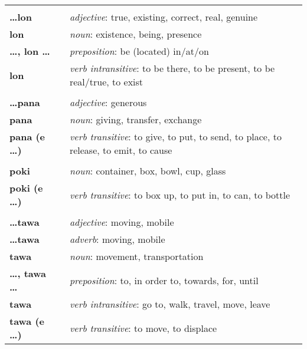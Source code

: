 \begin{supertabular}{p{2,5cm}|ll}
 && \\ %
%
\textbf{\dots lon} && \textit{adjective}: true, existing, correct, real, genuine \\ %
\textbf{lon} && \textit{noun}: existence, being, presence \\ %
\textbf{\dots , lon \dots} && \textit{preposition}: be (located) in/at/on \\ %
\textbf{lon} && \textit{verb intransitive}: to be there, to be present, to be real/true, to exist \\ %
 && \\ %
%
\textbf{\dots pana} && \textit{adjective}: generous \\ %
\textbf{pana} && \textit{noun}: giving, transfer, exchange \\ %
\textbf{pana (e \dots)} && \textit{verb transitive}: to give, to put, to send, to place, to release, to emit, to cause \\ %
 && \\ %
%
\textbf{poki} && \textit{noun}: container, box, bowl, cup, glass \\ %
\textbf{poki (e \dots)} && \textit{verb transitive}: to box up, to put in, to can, to bottle \\ %
 && \\ %
%
\textbf{\dots tawa} && \textit{adjective}: moving, mobile \\ %
\textbf{\dots tawa} && \textit{adverb}: moving, mobile \\ %
\textbf{tawa} && \textit{noun}: movement, transportation \\ %
\textbf{\dots , tawa \dots} && \textit{preposition}: to, in order to, towards, for, until \\ %
\textbf{tawa} && \textit{verb intransitive}: go to, walk, travel, move, leave \\ %
\textbf{tawa (e \dots)} && \textit{verb transitive}: to move, to displace \\ %
\end{supertabular} \\
%
\newpage{}
%
